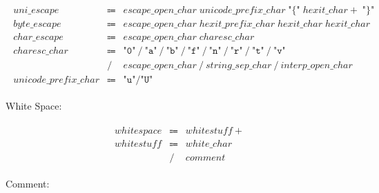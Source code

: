 \begin{align*}
\begin{array}{rcll}
        \mathit{uni\_escape}
        &\Coloneq &\mathit{escape\_open\_char}\; \mathit{unicode\_prefix\_char}\; \texttt{"\{"}\; \mathit{hexit\_char}{+}\; \texttt{"\}"} \\
        \mathit{byte\_escape}
        &\Coloneq &\mathit{escape\_open\_char}\; \mathit{hexit\_prefix\_char}\; \mathit{hexit\_char}\; \mathit{hexit\_char} \\
        \mathit{char\_escape}
        &\Coloneq &\mathit{escape\_open\_char}\; \mathit{charesc\_char} \\
        \mathit{charesc\_char}
        &\Coloneq &\texttt{"0"} \mathrel{/} \texttt{"a"} \mathrel{/} \texttt{"b"} \mathrel{/} \texttt{"f"} \mathrel{/} \texttt{"n"} \mathrel{/} \texttt{"r"} \mathrel{/} \texttt{"t"} \mathrel{/} \texttt{"v"} \\
        &\mathrel{/} &\mathit{escape\_open\_char} \mathrel{/} \mathit{string\_sep\_char} \mathrel{/} \mathit{interp\_open\_char} \\
        \mathit{unicode\_prefix\_char}
        &\Coloneq &\texttt{"u"} \mathrel{/} \texttt{"U"}
    \end{array}
\end{align*}

White Space:

\begin{align*}
    \begin{array}{rcll}
        \mathit{whitespace}
        &\Coloneq &\mathit{whitestuff}{+} \\
        \mathit{whitestuff}
        &\Coloneq &\mathit{white\_char} \\
        &\mathrel{/} &\mathit{comment}
    \end{array}
\end{align*}

Comment:

